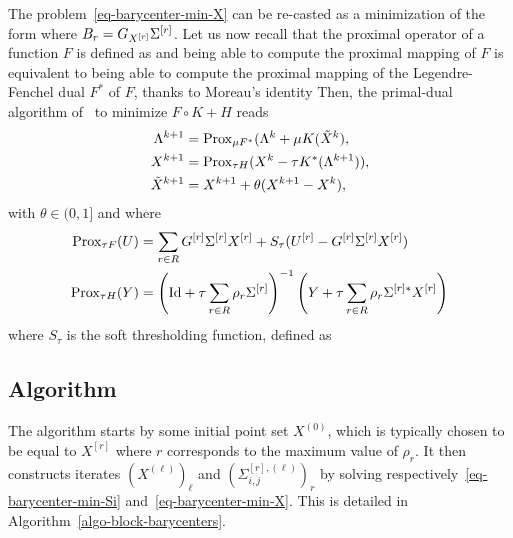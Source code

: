 The problem~\eqref{eq-barycenter-min-X} can be re-casted as a minimization of the form 
where $B_r = G_{X^{[r]}} \Sigma^{[r]}$.  Let us now recall that the proximal operator of a function $F$ is defined as 
and being able to compute the proximal mapping of $F$ is equivalent to being able to compute the proximal mapping of the Legendre-Fenchel dual $F^*$ of $F$, thanks to Moreau's identity
Then, the primal-dual algorithm of~\cite{Chambolle11} to minimize $F \circ K + H$ reads
\begin{align}\label{eq-pd-bary}
	\nonumber \La^{k+1} &= \Prox_{\mu F^*}( \La^k + \mu K(\tilde X^k), \\
	 X^{k+1} &= \Prox_{\tau H}(  X^k-\tau K^*(\La^{k+1}) ), \\
	\nonumber \tilde X^{k+1} &= X^{k+1} + \theta (X^{k+1} - X^k) ,
\end{align}
with $\theta \in (0,1]$ and where 
\begin{align*}
\operatorname{Prox}_{\tau F}(U) &=\sum_{r \in R} G^{[r]} \Sigma^{[r]} X^{[r]} + S_\tau(U^{[r]} - G^{[r]} \Sigma^{[r]} X^{[r]}) \\
\operatorname{Prox}_{\tau H}(Y) &= \left( \mathrm{Id}+ \tau \sum_{r \in R}  \rho_r \Sigma^{[r]}  \right)^{-1} \left(Y + \tau \sum_{r \in R} \rho_r \Sigma^{[r]*} X^{[r]} \right)
\end{align*}
where $S_\tau$ is the soft thresholding function, defined as


\subsection{Algorithm}

The algorithm starts by some initial point set $X^{(0)}$, which is typically chosen to be equal to $X^{[r]}$ where $r$ corresponds to the maximum value of $\rho_r$. It then constructs iterates $(X^{(\ell)})_{\ell}$ and $( \Sigma_{i,j}^{[r],(\ell)} )_r$ by solving respectively~\eqref{eq-barycenter-min-Si} and~\eqref{eq-barycenter-min-X}. This is detailed in Algorithm~\ref{algo-block-barycenters}. 


